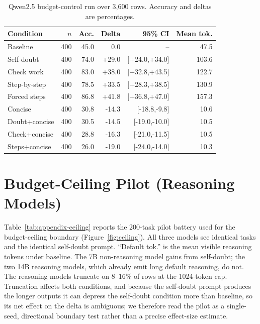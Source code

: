 \documentclass{article}
\begin{document}
\begin{table}[htbp]
\centering
\scriptsize
\caption{Qwen2.5 budget-control run over 3,600 rows. Accuracy and deltas are percentages.}
\label{tab:appendix-budget}
\begin{tabular}{lrrrrr}
\toprule
Condition & $n$ & Acc. & Delta & 95\% CI & Mean tok. \\
\midrule
Baseline & 400 & 45.0 & 0.0 & -- & 47.5 \\
Self-doubt & 400 & 74.0 & +29.0 & [+24.0,+34.0] & 103.6 \\
Check work & 400 & 83.0 & +38.0 & [+32.8,+43.5] & 122.7 \\
Step-by-step & 400 & 78.5 & +33.5 & [+28.3,+38.5] & 130.9 \\
Forced steps & 400 & 86.8 & +41.8 & [+36.8,+47.0] & 157.3 \\
Concise & 400 & 30.8 & -14.3 & [-18.8,-9.8] & 10.6 \\
Doubt+concise & 400 & 30.5 & -14.5 & [-19.0,-10.0] & 10.5 \\
Check+concise & 400 & 28.8 & -16.3 & [-21.0,-11.5] & 10.5 \\
Steps+concise & 400 & 26.0 & -19.0 & [-24.0,-14.0] & 10.3 \\
\bottomrule
\end{tabular}
\end{table}

\section{Budget-Ceiling Pilot (Reasoning Models)}

Table~\ref{tab:appendix-ceiling} reports the 200-task pilot battery used for the budget-ceiling boundary (Figure~\ref{fig:ceiling}). All three models see identical tasks and the identical self-doubt prompt. ``Default tok.'' is the mean visible reasoning tokens under baseline. The 7B non-reasoning model gains from self-doubt; the two 14B reasoning models, which already emit long default reasoning, do not. The reasoning models truncate on $8$--$16\%$ of rows at the 1024-token cap. Truncation affects both conditions, and because the self-doubt prompt produces the longer outputs it can depress the self-doubt condition more than baseline, so its net effect on the delta is ambiguous; we therefore read the pilot as a single-seed, directional boundary test rather than a precise effect-size estimate.
\end{document}
